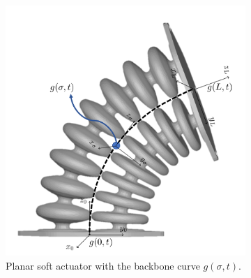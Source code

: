 \begin{figure}[H]
  \begin{minipage}{\linewidth}
      \centering
      \begin{minipage}{0.45\linewidth}
        \begin{figure}[H]
        \centering
            \includegraphics[width=\textwidth]{Figures/Chapter2/actuatorschematic.png}
            \caption{Planar soft actuator with the backbone curve $g(\sigma,t)$.}
            \label{fig2:kinematicschematic}
        \end{figure}
      \end{minipage}
      \hspace{0.05\linewidth}
      \begin{minipage}{0.45\linewidth}
          \begin{figure}[H]

\end{figure}
\end{minipage}
\end{minipage}
\end{figure}
